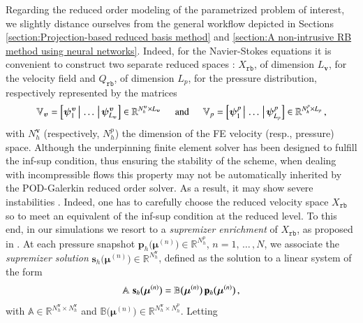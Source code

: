 \documentclass[longtitle]{elsarticle}
\numberwithin{equation}{section}
\theoremstyle{theorem}
\theoremstyle{definition}
\theoremstyle{remark}
\theoremstyle{proposition}
\numberwithin{figure}{section}
\newcommand{\bg}[1]{\boldsymbol{#1}}
\begin{document}
		Regarding the reduced order modeling of the parametrized problem of interest, we slightly distance ourselves from the general workflow depicted in Sections \ref{section:Projection-based reduced basis method} and \ref{section:A non-intrusive RB method using neural networks}. Indeed, for the Navier-Stokes equations it is convenient to construct two separate reduced spaces \cite{Bal14, Chen17, QMN15}: $X_{\texttt{rb}}$, of dimension $L_{\bg{v}}$, for the velocity field and $Q_{\texttt{rb}}$, of dimension $L_p$, for the pressure distribution, respectively represented by the matrices 
		\begin{equation*}
			\mathbb{V}_{\bg{v}} = \left[ \bg{\psi}_1^{\bg{v}} \, \big| \, \ldots \, \big| \, \bg{\psi}_{L_{\bg{v}}}^{\bg{v}} \right] \in \mathbb{R}^{N_h^{\bg{v}} \times L_{\bg{v}}} \hspace*{0.5cm} \text{and} \hspace*{0.5cm} \mathbb{V}_p = \left[ \bg{\psi}_1^p \, \big| \, \ldots \, \big| \, \bg{\psi}_{L_p}^p \right] \in \mathbb{R}^{N_h^p \times L_p} \, ,
		\end{equation*} 
		with $N_h^{\bg{v}}$ (respectively, $N_h^p$) the dimension of the FE velocity (resp., pressure) space. Although the underpinning finite element solver has been designed to fulfill the inf-sup condition, thus ensuring the stability of the scheme, when dealing with incompressible flows this property may not be automatically inherited by the POD-Galerkin reduced order solver. As a result, it may show severe instabilities \cite{Bur06}. Indeed, one has to carefully choose the reduced velocity space $X_{\texttt{rb}}$ so to meet an equivalent of the inf-sup condition at the reduced level. To this end, in our simulations we resort to a \emph{supremizer enrichment} of $X_{\texttt{rb}}$, as proposed in \cite{Bal14}. At each pressure snapshot $\mathbf{p}_h \big( \bg{\mu}^{(n)} \big) \in \mathbb{R}^{N_h^p}$, $n = 1, \, \ldots \, , N$, we associate the \emph{supremizer solution} $\mathbf{s}_h \big( \bg{\mu}^{(n)} \big) \in \mathbb{R}^{N_h^{\bg{v}}}$, defined as the solution to a linear system of the form
		\vspace*{-0.1cm}
		\begin{equation*}
			\mathbb{A} \,\, \mathbf{s}_h \big( \bg{\mu}^{(n)} \big) = \mathbb{B} \big( \bg{\mu}^{(n)} \big) \, \mathbf{p}_h \big( \bg{\mu}^{(n)} \big) \, ,
			\vspace*{-0.1cm}
		\end{equation*}
		with $\mathbb{A} \in \mathbb{R}^{N_h^{\bg{v}} \times N_h^{\bg{v}}}$ and $\mathbb{B} \big( \bg{\mu}^{(n)} \big) \in \mathbb{R}^{N_h^{\bg{v}} \times N_h^p}$. Letting 
\end{document}

